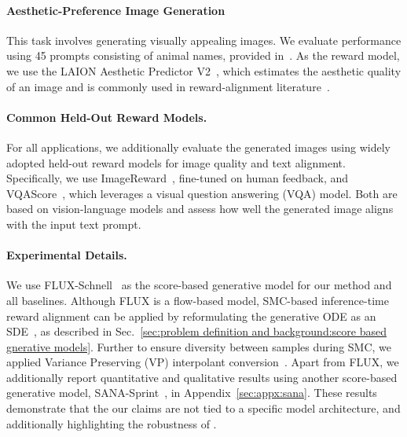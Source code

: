 \paragraph{Aesthetic-Preference Image Generation}
This task involves generating visually appealing images. We evaluate performance using 45 prompts consisting of animal names, provided in~\cite{black2024ddpo}. As the reward model, we use the LAION Aesthetic Predictor V2~\cite{schuhmann2022aesthetic}, which estimates the aesthetic quality of an image and is commonly used in reward-alignment literature~\cite{kim2025DAS, tang2024finetuningdiffusionmodelsstochastic, uehara2024bridging, black2024ddpo}. 

\vspace{-0.3cm}
\paragraph{Common Held-Out Reward Models.}
For all applications, we additionally evaluate the generated images using widely adopted held-out reward models for image quality and text alignment. Specifically, we use ImageReward~\cite{xu2023imagereward}, fine-tuned on human feedback, and VQAScore~\cite{lin2024vqa}, which leverages a visual question answering (VQA) model. 
Both are based on vision-language models and assess how well the generated image aligns with the input text prompt.

\paragraph{Experimental Details.}
\vspace{-0.3cm}
We use FLUX-Schnell~\cite{BlackForestLabs:2024Flux} as the score-based generative model for our method and all baselines. Although FLUX is a flow-based model, SMC-based inference-time reward alignment can be applied by reformulating the generative ODE as an SDE~\cite{ma2024sitexploringflowdiffusionbased,kim2025inference}, as described in Sec.~\ref{sec:problem definition and background:score based gnerative models}. 
Further to ensure diversity between samples during SMC, we applied Variance Preserving (VP) interpolant conversion~\cite{kim2025inference, lipman2024flowmatchingguidecode}. 
Apart from FLUX, we additionally report quantitative and qualitative results using another score-based generative model, SANA-Sprint~\cite{chen2025sanasprint}, in Appendix~\ref{sec:appx:sana}. These results demonstrate that the our claims are not tied to a specific model architecture, and additionally highlighting the robustness of \methodname{}.\\

